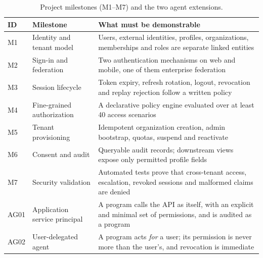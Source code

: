 \begin{table}[H]
\centering
\begin{tabularx}{\textwidth}{@{}l P{3.6cm} L@{}}
\toprule
\textbf{ID} & \textbf{Milestone} & \textbf{What must be demonstrable}\\
\midrule
M1 & Identity and tenant model & Users, external identities, profiles, organizations, memberships and roles are separate linked entities\\
M2 & Sign-in and federation & Two authentication mechanisms on web and mobile, one of them enterprise federation\\
M3 & Session lifecycle & Token expiry, refresh rotation, logout, revocation and replay rejection follow a written policy\\
M4 & Fine-grained authorization & A declarative policy engine evaluated over at least 40 access scenarios\\
M5 & Tenant provisioning & Idempotent organization creation, admin bootstrap, quotas, suspend and reactivate\\
M6 & Consent and audit & Queryable audit records; downstream views expose only permitted profile fields\\
M7 & Security validation & Automated tests prove that cross-tenant access, escalation, revoked sessions and malformed claims are denied\\
\midrule
AG01 & Application service principal & A program calls the API as itself, with an explicit and minimal set of permissions, and is audited as a program\\
AG02 & User-delegated agent & A program acts \emph{for} a user; its permission is never more than the user's, and revocation is immediate\\
\bottomrule
\end{tabularx}
\caption{Project milestones (M1--M7) and the two agent extensions.}
\label{tab:milestones}
\end{table}

